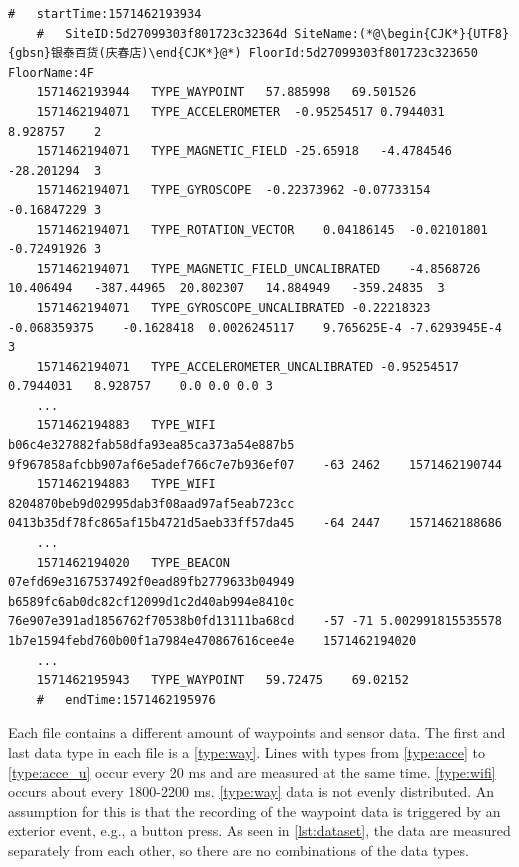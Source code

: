 
\begin{lstlisting}[caption={A snippet from the dataset of the file 5daa9e38df065a00069beb79.txt of the floor F4 of the site with the ID 5d27099303f801723c32364d},label={lst:dataset},captionpos=b]
    #   startTime:1571462193934
    #   SiteID:5d27099303f801723c32364d SiteName:(*@\begin{CJK*}{UTF8}{gbsn}银泰百货(庆春店)\end{CJK*}@*) FloorId:5d27099303f801723c323650 FloorName:4F
    1571462193944   TYPE_WAYPOINT   57.885998   69.501526
    1571462194071   TYPE_ACCELEROMETER  -0.95254517 0.7944031   8.928757    2
    1571462194071   TYPE_MAGNETIC_FIELD -25.65918   -4.4784546  -28.201294  3
    1571462194071   TYPE_GYROSCOPE  -0.22373962 -0.07733154 -0.16847229 3
    1571462194071   TYPE_ROTATION_VECTOR    0.04186145  -0.02101801 -0.72491926 3
    1571462194071   TYPE_MAGNETIC_FIELD_UNCALIBRATED    -4.8568726  10.406494   -387.44965  20.802307   14.884949   -359.24835  3
    1571462194071   TYPE_GYROSCOPE_UNCALIBRATED -0.22218323 -0.068359375    -0.1628418  0.0026245117    9.765625E-4 -7.6293945E-4   3
    1571462194071   TYPE_ACCELEROMETER_UNCALIBRATED -0.95254517 0.7944031   8.928757    0.0 0.0 0.0 3
    ...
    1571462194883   TYPE_WIFI   b06c4e327882fab58dfa93ea85ca373a54e887b5    9f967858afcbb907af6e5adef766c7e7b936ef07    -63 2462    1571462190744
    1571462194883   TYPE_WIFI   8204870beb9d02995dab3f08aad97af5eab723cc    0413b35df78fc865af15b4721d5aeb33ff57da45    -64 2447    1571462188686
    ...
    1571462194020   TYPE_BEACON 07efd69e3167537492f0ead89fb2779633b04949    b6589fc6ab0dc82cf12099d1c2d40ab994e8410c    76e907e391ad1856762f70538b0fd13111ba68cd    -57 -71 5.002991815535578   1b7e1594febd760b00f1a7984e470867616cee4e    1571462194020
    ...
    1571462195943   TYPE_WAYPOINT   59.72475    69.02152
    #   endTime:1571462195976
\end{lstlisting}

Each file contains a different amount of waypoints and sensor data.
The first and last data type in each file is a \ref{type:way}.
Lines with types from \ref{type:acce} to \ref{type:acce_u} occur every 20 ms and are measured at the same time.
\ref{type:wifi} occurs about every 1800-2200 ms.
\ref{type:way} data is not evenly distributed.
An assumption for this is that the recording of the waypoint data is triggered by an exterior event, e.g., a button press.
As seen in \cref{lst:dataset}, the data are measured separately from each other, so there are no combinations of the data types.

